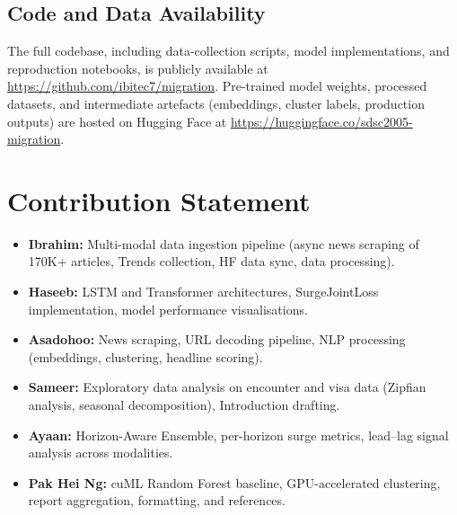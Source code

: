 \documentclass[11pt, a4paper]{article}
\begin{document}
\subsection{Code and Data Availability}

The full codebase, including data-collection scripts, model implementations, and
reproduction notebooks, is publicly available at
\url{https://github.com/ibitec7/migration}.  Pre-trained model weights, processed
datasets, and intermediate artefacts (embeddings, cluster labels, production outputs)
are hosted on Hugging Face at \url{https://huggingface.co/sdsc2005-migration}.


\section{Contribution Statement}

\begin{itemize}
  \item \textbf{Ibrahim:} Multi-modal data ingestion pipeline (async news scraping of
        170K+ articles, Trends collection, HF data sync, data processing).
  \item \textbf{Haseeb:} LSTM and Transformer architectures, SurgeJointLoss
        implementation, model performance visualisations.
  \item \textbf{Asadohoo:} News scraping, URL decoding pipeline, NLP processing
        (embeddings, clustering, headline scoring).
  \item \textbf{Sameer:} Exploratory data analysis on encounter and visa data
        (Zipfian analysis, seasonal decomposition), Introduction drafting.
  \item \textbf{Ayaan:} Horizon-Aware Ensemble, per-horizon surge metrics, lead--lag signal analysis across modalities.
  \item \textbf{Pak Hei Ng:} cuML Random Forest baseline, GPU-accelerated clustering,
        report aggregation, formatting, and references.
\end{itemize}


\newpage


\end{document}
